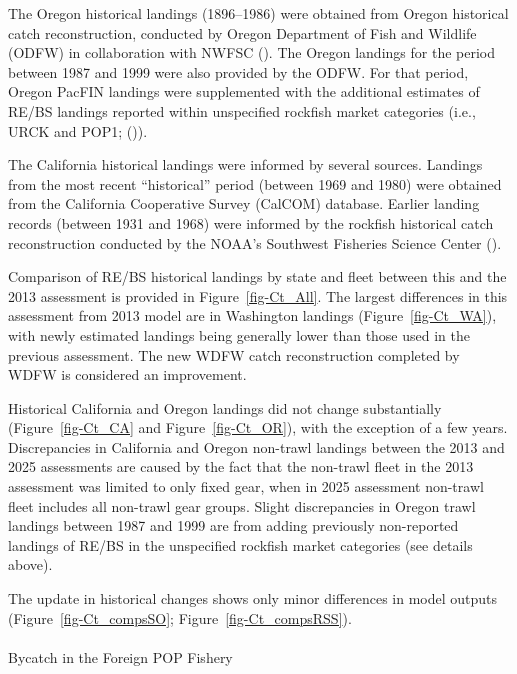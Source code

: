 \documentclass[
]{scrartcl}
\makeatletter
\let\oldparagraph\paragraph
\renewcommand{\paragraph}{
    \@ifstar
      \xxxParagraphStar
      \xxxParagraphNoStar
  }
\newcommand{\xxxParagraphStar}[1]{\oldparagraph*{#1}\mbox{}}
\newcommand{\xxxParagraphNoStar}[1]{\oldparagraph{#1}\mbox{}}
\makeatother
\begin{document}
The Oregon historical landings (1896--1986) were obtained from Oregon
historical catch reconstruction, conducted by Oregon Department of Fish
and Wildlife (ODFW) in collaboration with NWFSC
(). The Oregon landings for the period between 1987 and
1999 were also provided by the ODFW. For that period, Oregon PacFIN
landings were supplemented with the additional estimates of RE/BS
landings reported within unspecified rockfish market categories (i.e.,
URCK and POP1; ()).

The California historical landings were informed by several sources.
Landings from the most recent ``historical'' period (between 1969 and
1980) were obtained from the California Cooperative Survey (CalCOM)
database. Earlier landing records (between 1931 and 1968) were informed
by the rockfish historical catch reconstruction conducted by the NOAA's
Southwest Fisheries Science Center
().

Comparison of RE/BS historical landings by state and fleet between this
and the 2013 assessment is provided in Figure~\ref{fig-Ct_All}. The
largest differences in this assessment from 2013 model are in Washington
landings (Figure~\ref{fig-Ct_WA}), with newly estimated landings being
generally lower than those used in the previous assessment. The new WDFW
catch reconstruction completed by WDFW is considered an improvement.

Historical California and Oregon landings did not change substantially
(Figure~\ref{fig-Ct_CA} and Figure~\ref{fig-Ct_OR}), with the exception
of a few years. Discrepancies in California and Oregon non-trawl
landings between the 2013 and 2025 assessments are caused by the fact
that the non-trawl fleet in the 2013 assessment was limited to only
fixed gear, when in 2025 assessment non-trawl fleet includes all
non-trawl gear groups. Slight discrepancies in Oregon trawl landings
between 1987 and 1999 are from adding previously non-reported landings
of RE/BS in the unspecified rockfish market categories (see details
above).

The update in historical changes shows only minor differences in model
outputs (Figure~\ref{fig-Ct_compsSO}; Figure~\ref{fig-Ct_compsRSS}).

\paragraph{Bycatch in the Foreign POP
Fishery}\label{bycatch-in-the-foreign-pop-fishery}
\end{document}
